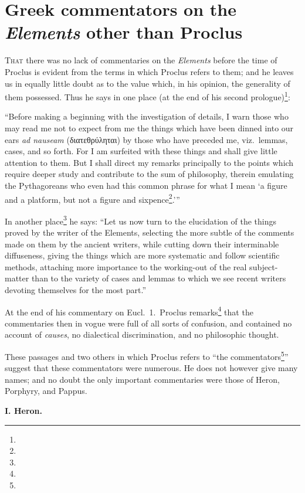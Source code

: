 \chapter[Greek commentators other than Proclus]{Greek commentators on the \emph{Elements} other than Proclus}

\textsc{That} there was no lack of commentaries on the \emph{Elements} before the time of Proclus is evident from the terms in which Proclus refers to them; and he leaves us in equally little doubt as to the value which, in his opinion, the generality of them possessed. Thus he says in one place (at the end of his second prologue)\footnote{}:

``Before making a beginning with the investigation of details, I warn those who may read me not to expect from me the things which have been dinned into our ears \emph{ad nauseam} (διατεθρύληται) by those who have preceded me, viz.\ lemmas, cases, and so forth. For I am surfeited with these things and shall give little attention to them. But I shall direct my remarks principally to the points which require deeper study and contribute to the sum of philosophy, therein emulating the Pythagoreans who even had this common phrase for what I mean `a figure and a platform, but not a figure and sixpence\footnote{}.'\thinspace''

In another place\footnote{} he says: ``Let us now turn to the elucidation of the things proved by the writer of the Elements, selecting the more subtle of the comments made on them by the ancient writers, while cutting down their interminable diffuseness, giving the things which are more systematic and follow scientific methods, attaching more importance to the working-out of the real subject-matter than to the variety of cases and lemmas to which we see recent writers devoting themselves for the most part.''

At the end of his commentary on Eucl.~1.\ Proclus remarks\footnote{} that the commentaries then in vogue were full of all sorts of confusion, and contained no account of \emph{causes}, no dialectical discrimination, and no philosophic thought.

These passages and two others in which Proclus refers to ``the commentators\footnote{}'' suggest that these commentators were numerous. He does not however give many names; and no doubt the only important commentaries were those of Heron, Porphyry, and Pappus.

\textbf{I. Heron.}

